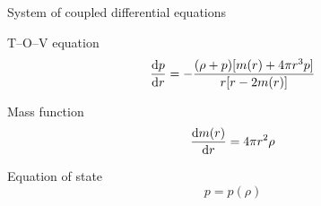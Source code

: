 \documentclass{beamer}
\let\svthefootnote\thefootnote
\newcommand\blankfootnote[1]{%
  \let\thefootnote\relax\footnotetext{#1}%
  \let\thefootnote\svthefootnote%
}
\begin{document}
\begin{frame}{System of coupled differential equations}

\begin{block}{T--O--V equation}
\begin{displaymath}
  \dv{p}{r} =
 -\frac{(\rho + p) [m(r) + 4 \pi r^3 p]}{r [r - 2m(r)]}
\end{displaymath}
\end{block}

\begin{block}{Mass function}
\begin{displaymath}
  \dv{m(r)}{r} = 4 \pi r^2 \rho
\end{displaymath}
\end{block}

\begin{block}{Equation of state}
\begin{displaymath}
  p = p(\rho)
\end{displaymath}
\end{block}

\blankfootnote{\textcite[pp. 261--262, 264]{Schutz}}



\end{frame}


\end{document}
